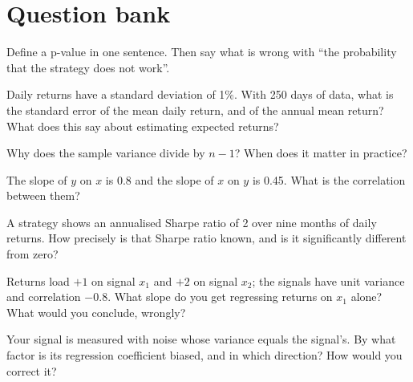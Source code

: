 \section{Question bank}

\begin{interviewq}\label{iq:iv:statistics:1}
Define a p-value in one sentence. Then say what is wrong with ``the probability that the strategy does not work''.
\end{interviewq}

\begin{interviewq}\label{iq:iv:statistics:2}
Daily returns have a standard deviation of 1\%. With 250 days of data, what is the standard error of the mean daily
return, and of the annual mean return? What does this say about estimating expected returns?
\end{interviewq}

\begin{interviewq}\label{iq:iv:statistics:3}
Why does the sample variance divide by $n - 1$? When does it matter in practice?
\end{interviewq}

\begin{interviewq}\label{iq:iv:statistics:4}
The slope of $y$ on $x$ is 0.8 and the slope of $x$ on $y$ is 0.45. What is the correlation between them?
\end{interviewq}

\begin{interviewq}\label{iq:iv:statistics:5}
A strategy shows an annualised Sharpe ratio of 2 over nine months of daily returns. How precisely is that Sharpe ratio
known, and is it significantly different from zero?
\end{interviewq}

\begin{interviewq}\label{iq:iv:statistics:6}
Returns load $+1$ on signal $x_1$ and $+2$ on signal $x_2$; the signals have unit variance and correlation $-0.8$.
What slope do you get regressing returns on $x_1$ alone? What would you conclude, wrongly?
\end{interviewq}

\begin{interviewq}\label{iq:iv:statistics:7}
Your signal is measured with noise whose variance equals the signal's. By what factor is its regression coefficient
biased, and in which direction? How would you correct it?
\end{interviewq}

